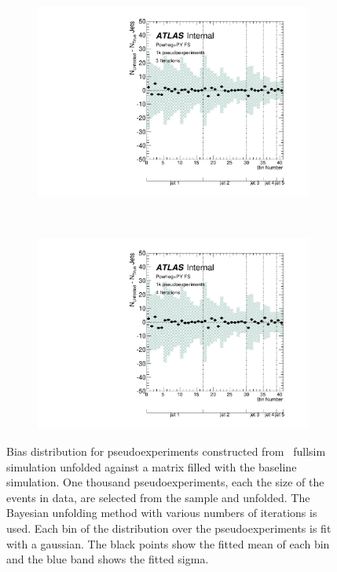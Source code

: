 \begin{figure}
\begin{subfigure}[]{0.5\textwidth}
\includegraphics[width=\textwidth]{fig/Stress/117050fullsim/Bias3Iterations.pdf}
\end{subfigure}
~
\begin{subfigure}[]{0.5\textwidth}
\includegraphics[width=\textwidth]{fig/Stress/117050fullsim/Bias4Iterations.pdf}
\end{subfigure}
\caption{Bias distribution for pseudoexperiments constructed from \powpy\ fullsim simulation unfolded against a matrix filled with the baseline simulation. One thousand pseudoexperiments, each the size of the events in data, are selected from the sample and unfolded. The Bayesian unfolding method with various numbers of iterations is used. Each bin of the distribution over the pseudoexperiments is fit with a gaussian. The black points show the fitted mean of each bin and the blue band shows the fitted sigma.}
\label{fig:fsbias}
\end{figure}
